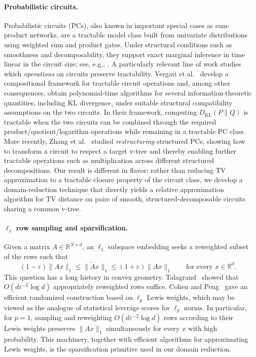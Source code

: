 \documentclass{article}
\begin{document}
\paragraph{Probabilistic circuits.}
Probabilistic circuits (PCs), also known in important special cases as
sum-product networks, are a tractable model class built from univariate
distributions using weighted sum and product gates.  Under structural
conditions such as smoothness and decomposability, they support exact
marginal inference in time linear in the circuit size; see, e.g.,
\cite{PoonDomingos11,PeharzTschiatschekPernkopf15,ChoiVergariVanDenBroeck20}.
A particularly relevant line of work studies which \emph{operations} on
circuits preserve tractability.  Vergari et al.~\cite{VergariEtAl21}
develop a compositional framework for tractable circuit operations and,
among other consequences, obtain polynomial-time algorithms for several
information-theoretic quantities, including KL divergence, under suitable
structural compatibility assumptions on the two circuits.  In their
framework, computing $D_{\mathrm{KL}}(P\|Q)$ is tractable when the two
circuits can be combined through the required product/quotient/logarithm
operations while remaining in a tractable PC class.  More recently,
Zhang et al.~\cite{ZhangWangArenasVanDenBroeck25} studied
\emph{restructuring} structured PCs, showing how to transform a circuit
to respect a target v-tree and thereby enabling further tractable
operations such as multiplication across different structured
decompositions.  Our result is different in flavor: rather than reducing
TV approximation to a tractable closure property of the circuit class, we
develop a domain-reduction technique that directly yields a relative
approximation algorithm for TV distance on pairs of smooth,
structured-decomposable circuits sharing a common v-tree.


\paragraph{$\ell_1$ row sampling and sparsification.}
Given a matrix
$A\in\mathbb{R}^{N\times d}$, an $\ell_1$ subspace embedding seeks a
reweighted subset of the rows such that
\[
    (1-\varepsilon)\|Ax\|_1
    \leq
    \|\widetilde A x\|_1
    \leq
    (1+\varepsilon)\|Ax\|_1
    \qquad\text{for every }x\in\mathbb{R}^d.
\]
This question has a long history in convex geometry.
Talagrand~\cite{Tal90} showed that
$O(d\varepsilon^{-2}\log d)$ appropriately reweighted rows suffice.
Cohen and Peng~\cite{cohen2015lp} gave an efficient randomized construction
based on $\ell_p$ Lewis weights, which may be viewed as the analogue of
statistical leverage scores for $\ell_p$ norms.  In particular, for
$p=1$, sampling and reweighting
$O(d\varepsilon^{-2}\log d)$ rows according to their Lewis weights
preserves $\|Ax\|_1$ simultaneously for every $x$ with high probability.
This machinery, together with efficient algorithms for approximating
Lewis weights, is the sparsification primitive used in our domain
reduction.
\end{document}
